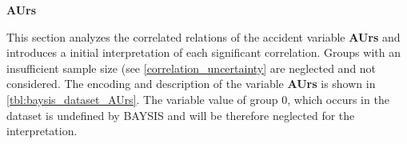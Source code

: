 \Large
\centerline{\textbf{AUrs}}
\normalsize
This section analyzes the correlated relations of the accident variable \textbf{AUrs} and introduces a initial interpretation of each significant correlation. Groups with an insufficient sample size (see \cref{correlation_uncertainty} are neglected and not considered. The encoding and description of the variable \textbf{AUrs} is shown in \cref{tbl:baysis_dataset_AUrs}. The variable value of group 0, which occurs in the dataset is undefined by BAYSIS and will be therefore neglected for the interpretation.

